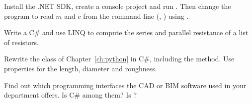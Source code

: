 \begin{exercises}
\item Install the .NET SDK, create a console project and run . Then change
  the program to read $m$ and $c$ from the command line (, )
  using .
\item Write a C\#  and use LINQ to compute
  the series and parallel resistance of a list of resistors.
\item Rewrite the  class of Chapter~\ref{ch:python} in C\#, including the
   method. Use properties for the length, diameter and roughness.
\item Find out which programming interfaces the CAD or BIM software used in your department
  offers. Is C\# among them? Is \py?
\end{exercises}

